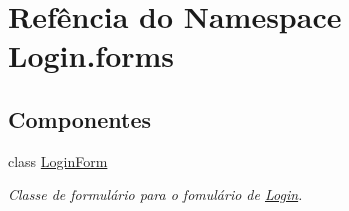 \hypertarget{namespaceLogin_1_1forms}{\section{Refência do Namespace Login.\-forms}
\label{namespaceLogin_1_1forms}
}
\subsection*{Componentes}
\begin{DoxyCompactItemize}
\item 
class \hyperlink{classLogin_1_1forms_1_1LoginForm}{Login\-Form}
\begin{DoxyCompactList}\small\item\em Classe de formulário para o fomulário de \hyperlink{namespaceLogin}{Login}. \end{DoxyCompactList}\end{DoxyCompactItemize}
